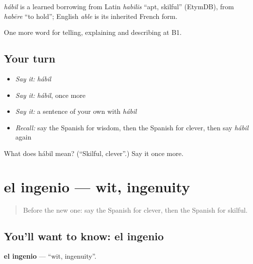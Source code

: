 \begin{cousinweb}
\emph{hábil} is a learned borrowing from Latin \emph{habilis} \textquotedblleft{}apt, skilful\textquotedblright{} (EtymDB), from \emph{habēre} \textquotedblleft{}to hold\textquotedblright{}; English \emph{able} is its inherited French form.
\end{cousinweb}

\begin{grammarlens}[title={What you've built}]
One more word for telling, explaining and describing at B1.
\end{grammarlens}

\subsection*{Your turn}
\begin{itemize}
\raggedright
  \item \emph{Say it:} \emph{hábil}
  \item \emph{Say it:} \emph{hábil}, once more
  \item \emph{Say it:} a sentence of your own with \emph{hábil}
  \item \emph{Recall:} say the Spanish for wisdom, then the Spanish for clever, then say \emph{hábil} again
\end{itemize}

\begin{tcolorbox}[breakable,colback=teal!4,colframe=teal!35!black,title={Before you move on}]
What does hábil mean? (\textquotedblleft{}Skilful, clever\textquotedblright{}.) Say it once more.
\end{tcolorbox}
\section[el ingenio]{el ingenio — wit, ingenuity}

\label{lesson:ES-C728-ingenio}



\begin{quote}
Before the new one: say the Spanish for clever, then the Spanish for skilful.
\end{quote}

\subsection*{You'll want to know: el ingenio}
\textbf{el ingenio} — \textquotedblleft{}wit, ingenuity\textquotedblright{}.

